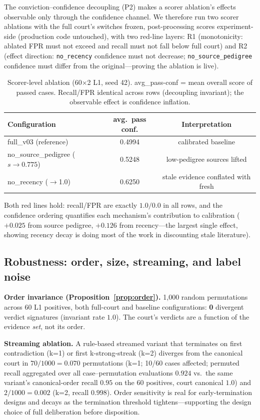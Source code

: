 \documentclass[11pt]{article}
\begin{document}
The conviction--confidence decoupling (P2) makes a scorer ablation's
effects observable only through the confidence channel. We therefore run
two scorer ablations with the full court's switches frozen, post-processing
scores experiment-side (production code untouched), with two red-line
layers: R1 (monotonicity: ablated FPR must not exceed and recall must not
fall below full court) and R2 (effect direction: \texttt{no\_recency}
confidence must not decrease; \texttt{no\_source\_pedigree} confidence must
differ from the original—proving the ablation is live).

\begin{table}[t]
\centering\small
\caption{Scorer-level ablation (60$\times$2 L1, seed 42). avg\_pass-conf =
mean overall score of passed cases. Recall/FPR identical across rows
(decoupling invariant); the observable effect is confidence inflation.}
\label{tab:scorerabl}
\begin{tabular}{@{}lcc@{}}
\toprule
Configuration & avg.\ pass conf. & Interpretation \\
\midrule
full\_v03 (reference) & 0.4994 & calibrated baseline \\
\;no\_source\_pedigree ($s\!\to\!0.775$) & 0.5248 & low-pedigree sources lifted \\
\;no\_recency ($\to$1.0) & 0.6250 & stale evidence conflated with fresh \\
\bottomrule
\end{tabular}
\end{table}

Both red lines hold: recall/FPR are exactly $1.0/0.0$ in all rows, and the
confidence ordering quantifies each mechanism's contribution to calibration
($+0.025$ from source pedigree, $+0.126$ from recency—the largest single
effect, showing recency decay is doing most of the work in discounting
stale literature).

\subsection{Robustness: order, size, streaming, and label noise}\label{sec:robust}

\textbf{Order invariance (Proposition~\ref{prop:order}).} 1{,}000 random
permutations across 60 L1 positives, both full-court and baseline
configurations: \textbf{0} divergent verdict signatures
(invariant rate $1.0$). The court's verdicts are a function of the evidence
\emph{set}, not its order.

\textbf{Streaming ablation.} A rule-based streamed variant that terminates
on first contradiction (k=1) or first k-strong-streak (k=2) diverges from
the canonical court in $70/1000=0.070$ permutations (k=1; 10/60 cases
affected; permuted recall aggregated over all case--permutation
evaluations $0.924$ vs.\ the same variant's canonical-order recall $0.95$
on the 60 positives, court canonical $1.0$) and $2/1000=0.002$ (k=2,
recall $0.998$). Order sensitivity is real
for early-termination designs and decays as the termination threshold
tightens—supporting the design choice of full deliberation before
disposition.
\end{document}
